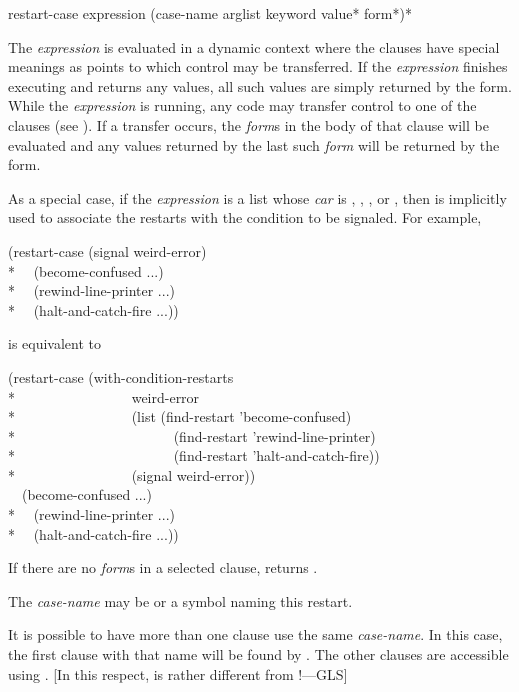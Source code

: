 \begin{defmac}
restart-case expression {(case-name arglist
                         {keyword value}*
                         {form}*)}*

The \emph{expression} is evaluated in a dynamic context where the clauses have
special meanings as points to which control may be transferred. If the
\emph{expression} finishes executing and returns any values, all such values are
simply returned by the  form. While the \emph{expression} is
running, any code may transfer control to one of the clauses (see
). If a transfer occurs, the \emph{form\/}s in the body of
that clause will be evaluated and any values returned by the last such
\emph{form} will be returned by the  form.

As a special case, if the \emph{expression} is a list whose \emph{car} is
, , , or , then
 is implicitly used to associate the restarts with
the condition to be signaled.  For example,
\begin{lisp}
(restart-case (signal weird-error) \\*
~~(become-confused ...) \\*
~~(rewind-line-printer ...) \\*
~~(halt-and-catch-fire ...))
\end{lisp}
is equivalent to
\begin{lisp}
(restart-case (with-condition-restarts \\*
~~~~~~~~~~~~~~~~weird-error  \\*
~~~~~~~~~~~~~~~~(list (find-restart 'become-confused)  \\*
~~~~~~~~~~~~~~~~~~~~~~(find-restart 'rewind-line-printer) \\*
~~~~~~~~~~~~~~~~~~~~~~(find-restart 'halt-and-catch-fire)) \\*
~~~~~~~~~~~~~~~~(signal weird-error)) \\
~~(become-confused ...) \\*
~~(rewind-line-printer ...) \\*
~~(halt-and-catch-fire ...))
\end{lisp}

If there are no \emph{form\/}s in a selected clause,  returns
.

The \emph{case-name} may be  or a symbol naming this restart.

It is possible to have more than one clause use the same \emph{case-name}.  In
this case, the first clause with that name will be found by
. The other clauses are accessible using
.  [In this respect,  is rather
different from !---GLS]


\end{defmac}
